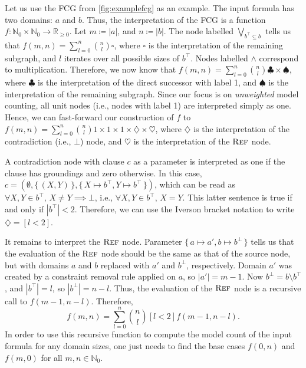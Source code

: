 \begin{example}
  Let us use the FCG from \cref{fig:examplefcg} as an example. The input formula
  has two domains: $a$ and $b$. Thus, the interpretation of the FCG is a
  function
  $f\colon \mathbb{N}_{0} \times \mathbb{N}_{0} \to \mathbb{R}_{\ge 0}$. Let
  $m \coloneqq |a|$, and $n \coloneqq |b|$. The node labelled
  $\bigvee_{b^{\top} \subseteq b}$ tells us that
  $f(m, n) = \sum_{l = 0}^{n} \binom{n}{l} \square$, where $\square$ is the
  interpretation of the remaining subgraph, and $l$ iterates over all possible
  sizes of $b^{\top}$. Nodes labelled $\land$ correspond to multiplication.
  Therefore, we now know that
  $f(m, n) = \sum_{l = 0}^{n} \binom{n}{l} \clubsuit \times \spadesuit$, where
  $\clubsuit$ is the interpretation of the direct successor with label 1, and
  $\spadesuit$ is the interpretation of the remaining subgraph. Since our focus
  is on \emph{unweighted} model counting, all unit nodes (i.e., nodes with label
  1) are interpreted simply as one. Hence, we can fast-forward our construction
  of $f$ to
  $f(m, n) = \sum_{l = 0}^{n} \binom{n}{l} 1 \times 1 \times 1 \times \diamondsuit \times \heartsuit$,
  where $\diamondsuit$ is the interpretation of the contradiction (i.e., $\bot$)
  node, and $\heartsuit$ is the interpretation of the $\operatorname{\textsc{Ref}}$ node.

  A contradiction node with clause $c$ as a parameter is interpreted as one if
  the clause has groundings and zero otherwise. In this case,
  $c = (\emptyset, \{\, (X, Y) \,\}, \{\, X \mapsto b^\top, Y \mapsto b^\top \,\})$,
  which can be read as $\forall X, Y \in b^{\top}\text{,
  }X \ne Y \implies \bot$, i.e., $\forall X, Y \in b^{\top}\text{, }X = Y$. This
  latter sentence is true if and only if $|b^{\top}| < 2$. Therefore, we
  can use the Iverson bracket notation to write $\diamondsuit = [l < 2]$.

  It remains to interpret the $\operatorname{\textsc{Ref}}$ node. Parameter
  $\{\, a \mapsto a', b \mapsto b^\bot \,\}$ tells us that the evaluation of the
  $\operatorname{\textsc{Ref}}$ node should be the same as that of the source node, but with domains
  $a$ and $b$ replaced with $a'$ and $b^{\bot}$, respectively. Domain $a'$ was
  created by a constraint removal rule applied on $a$, so $|a'| = m - 1$. Now
  $b^{\bot} = b \setminus b^{\top}$, and $|b^{\top}| = l$, so
  $|b^{\bot}| = n - l$. Thus, the evaluation of the $\operatorname{\textsc{Ref}}$ node is a recursive
  call to $f(m - 1, n - l)$. Therefore,
  \[
    f(m, n) = \sum_{l = 0}^{n} \binom{n}{l} [l < 2] f(m-1, n-l).
  \]
  In order to use this recursive function to compute the model count of the
  input formula for any domain sizes, one just needs to find the base cases
  $f(0, n)$ and $f(m, 0)$ for all $m, n \in \mathbb{N}_{0}$.
\end{example}


